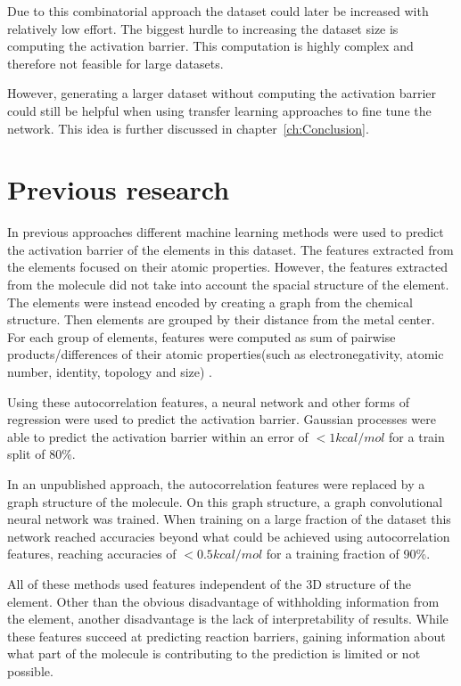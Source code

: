 Due to this combinatorial approach the dataset could later be increased with relatively low effort.
The biggest hurdle to increasing the dataset size is computing the activation barrier.
This computation is highly complex and therefore not feasible for large datasets.

However, generating a larger dataset without computing the activation barrier could still be helpful when using transfer learning approaches to fine tune the network.
This idea is further discussed in chapter~\ref{ch:Conclusion}.


\section{Previous research}

In previous approaches different machine learning methods were used to predict the activation barrier of the elements in this dataset.
The features extracted from the elements focused on their atomic properties.
However, the features extracted from the molecule did not take into account the spacial structure of the element.
The elements were instead encoded by creating a graph from the chemical structure.
Then elements are grouped by their distance from the metal center.
For each group of elements, features were computed as sum of pairwise products/differences of their atomic properties(such as electronegativity, atomic number, identity, topology and size) \cite{friederich_dos}.


Using these autocorrelation features, a neural network and other forms of regression were used to predict the activation barrier.
Gaussian processes were able to predict the activation barrier within an error of $<1 kcal/mol$ for a train split of $80\%$.

In an unpublished approach, the autocorrelation features were replaced by a graph structure of the molecule.
On this graph structure, a graph convolutional neural network was trained.
When training on a large fraction of the dataset this network reached accuracies 
beyond what could be achieved using autocorrelation features, reaching accuracies of $<0.5 kcal/mol$ for a training fraction of 90\%.

All of these methods used features independent of the 3D structure of the element.
Other than the obvious disadvantage of withholding information from the element, another disadvantage is the lack of interpretability of results.
While these features succeed at predicting reaction barriers, gaining 
information about what part of the molecule is contributing to the prediction is limited or not possible.

